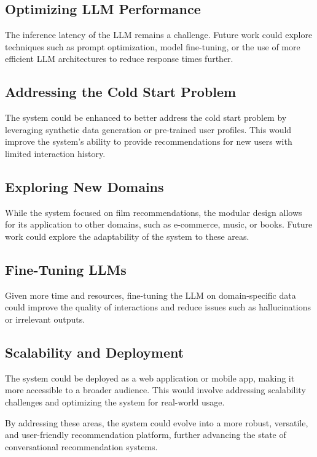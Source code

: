 \subsection{Optimizing LLM Performance}
The inference latency of the LLM remains a challenge. Future work could explore techniques such as prompt optimization, model fine-tuning, or the use of more efficient LLM architectures to reduce response times further.

\subsection{Addressing the Cold Start Problem}
The system could be enhanced to better address the cold start problem by leveraging synthetic data generation or pre-trained user profiles. This would improve the system's ability to provide recommendations for new users with limited interaction history.

\subsection{Exploring New Domains}
While the system focused on film recommendations, the modular design allows for its application to other domains, such as e-commerce, music, or books. Future work could explore the adaptability of the system to these areas.

\subsection{Fine-Tuning LLMs}
Given more time and resources, fine-tuning the LLM on domain-specific data could improve the quality of interactions and reduce issues such as hallucinations or irrelevant outputs.

\subsection{Scalability and Deployment}
The system could be deployed as a web application or mobile app, making it more accessible to a broader audience. This would involve addressing scalability challenges and optimizing the system for real-world usage.

By addressing these areas, the system could evolve into a more robust, versatile, and user-friendly recommendation platform, further advancing the state of conversational recommendation systems.


